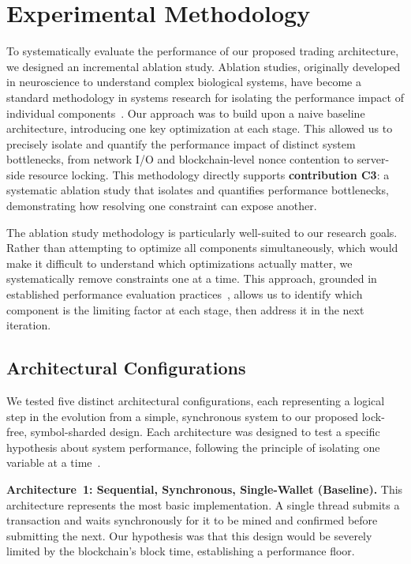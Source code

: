 \section{Experimental Methodology}
\label{sec:methodology}

To systematically evaluate the performance of our proposed trading architecture, we designed an incremental ablation study. Ablation studies, originally developed in neuroscience to understand complex biological systems, have become a standard methodology in systems research for isolating the performance impact of individual components~\cite{meyes2019ablation}. Our approach was to build upon a naive baseline architecture, introducing one key optimization at each stage. This allowed us to precisely isolate and quantify the performance impact of distinct system bottlenecks, from network I/O and blockchain-level nonce contention to server-side resource locking. This methodology directly supports \textbf{contribution C3}: a systematic ablation study that isolates and quantifies performance bottlenecks, demonstrating how resolving one constraint can expose another.

The ablation study methodology is particularly well-suited to our research goals. Rather than attempting to optimize all components simultaneously, which would make it difficult to understand which optimizations actually matter, we systematically remove constraints one at a time. This approach, grounded in established performance evaluation practices~\cite{john2007performance}, allows us to identify which component is the limiting factor at each stage, then address it in the next iteration.

\subsection{Architectural Configurations}

We tested five distinct architectural configurations, each representing a logical step in the evolution from a simple, synchronous system to our proposed lock-free, symbol-sharded design. Each architecture was designed to test a specific hypothesis about system performance, following the principle of isolating one variable at a time~\cite{john2007performance}.

\textbf{Architecture~1: Sequential, Synchronous, Single-Wallet (Baseline).}
This architecture represents the most basic implementation. A single thread submits a transaction and waits synchronously for it to be mined and confirmed before submitting the next. Our hypothesis was that this design would be severely limited by the blockchain's block time, establishing a performance floor.

